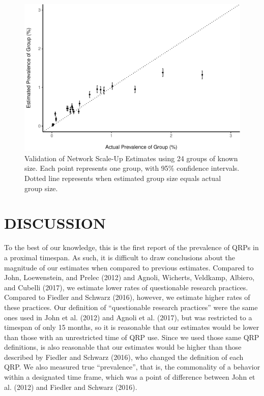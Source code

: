 \documentclass[man]{apa6}
\theoremstyle{definition}
\theoremstyle{definition}
\theoremstyle{definition}
\theoremstyle{remark}
\begin{document}
\begin{figure}
\centering
\includegraphics{papaja_test_files/figure-latex/fig2-1.pdf}
\caption{\label{fig:fig2}\label{fig:fig2}Validation of Network Scale-Up
Estimates using 24 groups of known size. Each point represents one
group, with 95\% confidence intervals. Dotted line represents when
estimated group size equals actual group size.}
\end{figure}

\section{DISCUSSION}\label{discussion}

To the best of our knowledge, this is the first report of the prevalence
of QRPs in a proximal timespan. As such, it is difficult to draw
conclusions about the magnitude of our estimates when compared to
previous estimates. Compared to John, Loewenstein, and Prelec (2012) and
Agnoli, Wicherts, Veldkamp, Albiero, and Cubelli (2017), we estimate
lower rates of questionable research practices. Compared to Fiedler and
Schwarz (2016), however, we estimate higher rates of these practices.
Our definition of \enquote{questionable research practices} were the
same ones used in John et al. (2012) and Agnoli et al. (2017), but was
restricted to a timespan of only 15 months, so it is reasonable that our
estimates would be lower than those with an unrestricted time of QRP
use. Since we used those same QRP definitions, is also reasonable that
our estimates would be higher than those described by Fiedler and
Schwarz (2016), who changed the definition of each QRP. We also measured
true \enquote{prevalence}, that is, the commonality of a behavior within
a designated time frame, which was a point of difference between John et
al. (2012) and Fiedler and Schwarz (2016).
\end{document}
